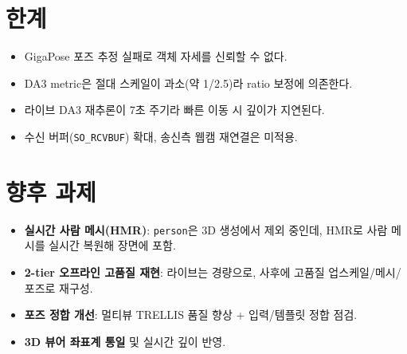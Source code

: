 \section{한계}
\begin{itemize}
  \item GigaPose 포즈 추정 실패로 객체 자세를 신뢰할 수 없다.
  \item DA3 metric은 절대 스케일이 과소(약 1/2.5)라 ratio 보정에 의존한다.
  \item 라이브 DA3 재추론이 7초 주기라 빠른 이동 시 깊이가 지연된다.
  \item 수신 버퍼(\texttt{SO\_RCVBUF}) 확대, 송신측 웹캠 재연결은 미적용.
\end{itemize}

\section{향후 과제}
\begin{itemize}
  \item \textbf{실시간 사람 메시(HMR)}: \texttt{person}은 3D 생성에서 제외 중인데,
        HMR로 사람 메시를 실시간 복원해 장면에 포함.
  \item \textbf{2-tier 오프라인 고품질 재현}: 라이브는 경량으로, 사후에 고품질
        업스케일/메시/포즈로 재구성.
  \item \textbf{포즈 정합 개선}: 멀티뷰 TRELLIS 품질 향상 + 입력/템플릿 정합 점검.
  \item \textbf{3D 뷰어 좌표계 통일} 및 실시간 깊이 반영.
\end{itemize}
